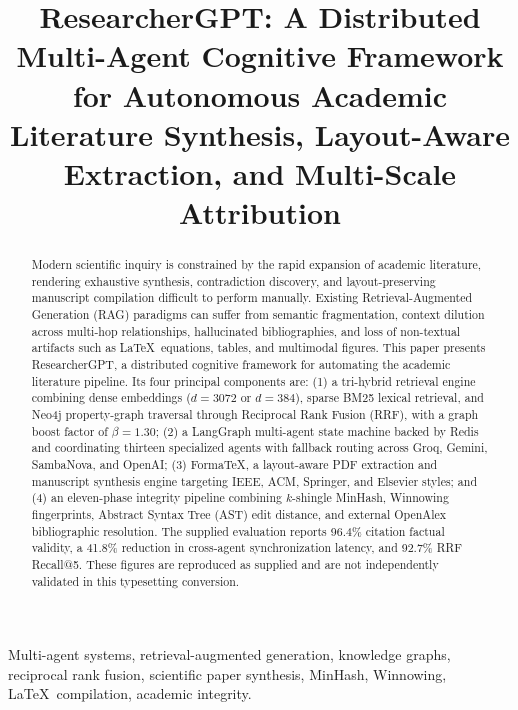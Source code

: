 \documentclass[conference]{IEEEtran}
\title{ResearcherGPT: A Distributed Multi-Agent Cognitive Framework for Autonomous Academic Literature Synthesis, Layout-Aware Extraction, and Multi-Scale Attribution}
\author{
\IEEEauthorblockN{Archit Gupta}
\IEEEauthorblockA{
\textit{Department of Artificial Intelligence and Data Science}\\
\textit{Email: [architag1503@gmail.com](mailto:architag1503@gmail.com)}
}
}
\begin{document}
\maketitle
\begin{abstract}
Modern scientific inquiry is constrained by the rapid expansion of academic literature, rendering exhaustive synthesis, contradiction discovery, and layout-preserving manuscript compilation difficult to perform manually. Existing Retrieval-Augmented Generation (RAG) paradigms can suffer from semantic fragmentation, context dilution across multi-hop relationships, hallucinated bibliographies, and loss of non-textual artifacts such as \LaTeX\ equations, tables, and multimodal figures. This paper presents ResearcherGPT, a distributed cognitive framework for automating the academic literature pipeline. Its four principal components are: (1) a tri-hybrid retrieval engine combining dense embeddings ($d=3072$ or $d=384$), sparse BM25 lexical retrieval, and Neo4j property-graph traversal through Reciprocal Rank Fusion (RRF), with a graph boost factor of $\beta=1.30$; (2) a LangGraph multi-agent state machine backed by Redis and coordinating thirteen specialized agents with fallback routing across Groq, Gemini, SambaNova, and OpenAI; (3) FormaTeX, a layout-aware PDF extraction and manuscript synthesis engine targeting IEEE, ACM, Springer, and Elsevier styles; and (4) an eleven-phase integrity pipeline combining $k$-shingle MinHash, Winnowing fingerprints, Abstract Syntax Tree (AST) edit distance, and external OpenAlex bibliographic resolution. The supplied evaluation reports 96.4\% citation factual validity, a 41.8\% reduction in cross-agent synchronization latency, and 92.7\% RRF Recall@5. These figures are reproduced as supplied and are not independently validated in this typesetting conversion.
\end{abstract}
\begin{IEEEkeywords}
Multi-agent systems, retrieval-augmented generation, knowledge graphs, reciprocal rank fusion, scientific paper synthesis, MinHash, Winnowing, \LaTeX\ compilation, academic integrity.
\end{IEEEkeywords}
\end{document}
